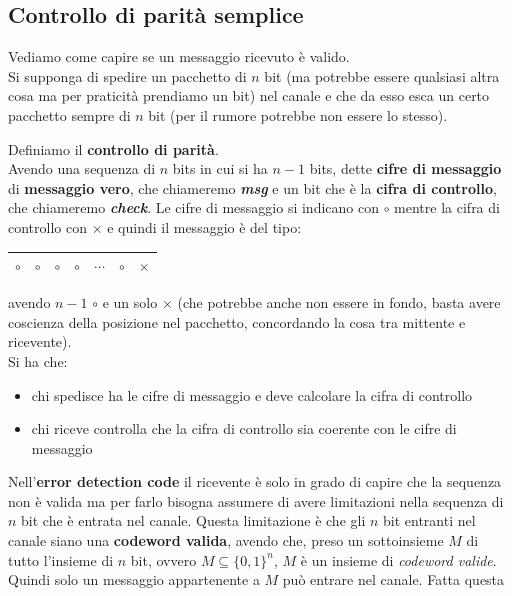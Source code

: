\documentclass[a4paper,12pt, oneside]{book}
\begin{document}
\subsection{Controllo di parità semplice}
Vediamo come capire se un messaggio ricevuto è valido.\\
Si supponga di spedire un pacchetto di $n$ bit (ma potrebbe essere qualsiasi
altra cosa ma per praticità prendiamo un bit) nel canale e che da esso esca un
certo pacchetto sempre di $n$ bit (per il rumore potrebbe non essere lo stesso).
\begin{definizione}
  Definiamo il \textbf{controllo di parità}. \\
  Avendo una sequenza di $n$ bits in
  cui si ha $n-1$ bits, dette \textbf{cifre di messaggio} di
  \textbf{messaggio vero}, che chiameremo
  \textbf{\textit{msg}} e un bit che è la \textbf{cifra di controllo}, che
  chiameremo \textbf{\textit{check}}. Le cifre di messaggio si indicano con
  $\circ$ mentre la cifra di controllo con $\times$ e quindi il messaggio è del
  tipo:
  \begin{table}[H]
    \centering
    \begin{tabular}{|c|c|c|c|c|c|c|}
      \hline
      $\circ$&$\circ$&$\circ$&$\circ$&$\cdots$&$\circ$&$\times$\\
      \hline
    \end{tabular}
  \end{table}
  avendo $n-1$ $\circ$ e un solo $\times$ (che potrebbe anche non essere in
  fondo, basta avere coscienza della posizione nel pacchetto, concordando la
  cosa tra mittente e ricevente).\\
  Si ha che:
  \begin{itemize}
    \item chi spedisce ha le cifre di messaggio e deve calcolare la cifra di
    controllo
    \item chi riceve controlla che la cifra di controllo sia coerente con le
    cifre di messaggio
  \end{itemize}
  Nell'\textbf{error detection code} il ricevente è solo in grado di capire che
  la sequenza non è valida ma per farlo bisogna assumere di avere limitazioni
  nella sequenza di $n$ bit che è entrata nel canale. Questa limitazione è che
  gli $n$ bit entranti nel canale siano una \textbf{codeword valida}, avendo
  che, preso un sottoinsieme $M$ di tutto l'insieme di $n$ bit, ovvero
  $M\subseteq\{0,1\}^n$, $M$ è un insieme di \textit{codeword valide}. Quindi
  solo un messaggio appartenente a $M$ può entrare nel canale. Fatta questa

\end{definizione}
\end{document}
